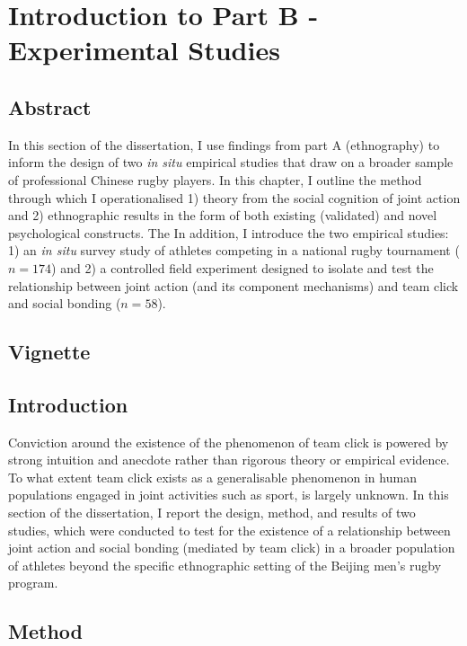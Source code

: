 \chapter{\label{partBintroMethod}Introduction to Part B - Experimental Studies}


  \minitoc


\section{Abstract}

In this section of the dissertation, I use findings from part A (ethnography) to inform the design of two \textit{in situ} empirical studies that draw on a broader sample of professional Chinese rugby players.  In this chapter, I outline the method through which I operationalised 1) theory from the social cognition of joint action and 2) ethnographic results in the form of both existing (validated) and novel psychological constructs.  The In addition, I introduce the two empirical studies: 1) an \textit{in situ} survey study of athletes competing in a national rugby tournament ($n = 174$) and 2) a controlled field experiment designed to isolate and test the relationship between joint action (and its component mechanisms) and team click and social bonding ($n= 58$).

\section{Vignette}



\section{Introduction}

Conviction around the existence of the phenomenon of team click is powered by strong intuition and anecdote rather than rigorous theory or empirical evidence. To what extent team click exists as a generalisable phenomenon in human populations engaged in joint activities such as sport, is largely unknown.  In this section of the dissertation, I report the design, method, and results of two studies, which were conducted to test for the existence of a relationship between joint action and social bonding (mediated by team click) in a broader population of athletes beyond the specific ethnographic setting of the Beijing men's rugby program.


\section{Method}


